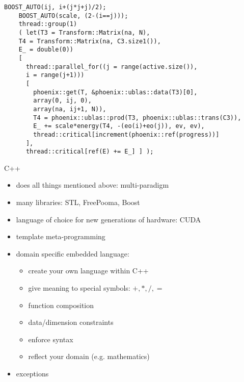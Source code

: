 \documentclass{beamer}
\begin{document}
\tiny {
  \lstset{numbers=left,language=C++}
  \begin{lstlisting}[label=some-code,caption=MP2 Example]
    BOOST_AUTO(ij, i+(j*j+j)/2);
    BOOST_AUTO(scale, (2-(i==j)));
    thread::group(1)
    ( let(T3 = Transform::Matrix(na, N),
    T4 = Transform::Matrix(na, C3.size1()),
    E_ = double(0))
    [
      thread::parallel_for((j = range(active.size()),
      i = range(j+1)))
      [
        phoenix::get(T, &phoenix::ublas::data(T3)[0],
        array(0, ij, 0),
        array(na, ij+1, N)),
        T4 = phoenix::ublas::prod(T3, phoenix::ublas::trans(C3)),
        E_ += scale*energy(T4, -(eo(i)+eo(j)), ev, ev),
        thread::critical[increment(phoenix::ref(progress))]
      ],
      thread::critical[ref(E) += E_] ] );
  \end{lstlisting}
}

\normalsize
\begin{frame}{C++}
  \begin{itemize}
  \item does all things mentioned above: multi-paradigm
  \item many libraries: STL, FreePooma, Boost
  \item language of choice for new generations of hardware: CUDA
  \item template meta-programming
  \item domain specific embedded language:
    \begin{itemize}
    \item create your own language within C++
    \item give meaning to special symbols: $+, *, /, =$
    \item function composition
    \item data/dimension constraints
    \item enforce syntax
    \item reflect your domain (e.g. mathematics)
    \end{itemize}
  \item exceptions
  \end{itemize}
\end{frame}
\end{document}
